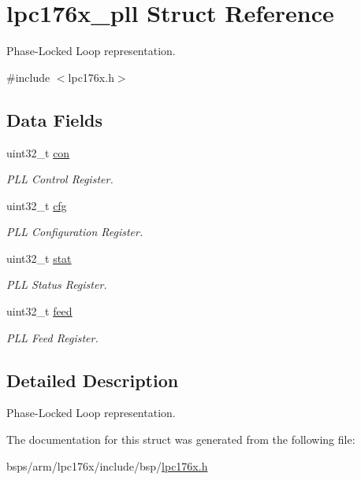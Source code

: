 \hypertarget{structlpc176x__pll}{}\section{lpc176x\+\_\+pll Struct Reference}
\label{structlpc176x__pll}


Phase-\/\+Locked Loop representation.  




{\ttfamily \#include $<$lpc176x.\+h$>$}

\subsection*{Data Fields}
\begin{DoxyCompactItemize}
\item 
\mbox{\label{structlpc176x__pll_acd180cbd1676549cd8b607857f80ccc2}} 
uint32\+\_\+t \mbox{\hyperlink{structlpc176x__pll_acd180cbd1676549cd8b607857f80ccc2}{con}}
\begin{DoxyCompactList}\small\item\em P\+LL Control Register. \end{DoxyCompactList}\item 
\mbox{\label{structlpc176x__pll_a6640975ae1b8a2d828ee133d9263d778}} 
uint32\+\_\+t \mbox{\hyperlink{structlpc176x__pll_a6640975ae1b8a2d828ee133d9263d778}{cfg}}
\begin{DoxyCompactList}\small\item\em P\+LL Configuration Register. \end{DoxyCompactList}\item 
\mbox{\label{structlpc176x__pll_a257298e9458c50a82c7016fd8a73554b}} 
uint32\+\_\+t \mbox{\hyperlink{structlpc176x__pll_a257298e9458c50a82c7016fd8a73554b}{stat}}
\begin{DoxyCompactList}\small\item\em P\+LL Status Register. \end{DoxyCompactList}\item 
\mbox{\label{structlpc176x__pll_a41f9da64ef2054fbe180ee9d15fd1637}} 
uint32\+\_\+t \mbox{\hyperlink{structlpc176x__pll_a41f9da64ef2054fbe180ee9d15fd1637}{feed}}
\begin{DoxyCompactList}\small\item\em P\+LL Feed Register. \end{DoxyCompactList}\end{DoxyCompactItemize}


\subsection{Detailed Description}
Phase-\/\+Locked Loop representation. 

The documentation for this struct was generated from the following file\+:\begin{DoxyCompactItemize}
\item 
bsps/arm/lpc176x/include/bsp/\mbox{\hyperlink{lpc176x_8h}{lpc176x.\+h}}\end{DoxyCompactItemize}
